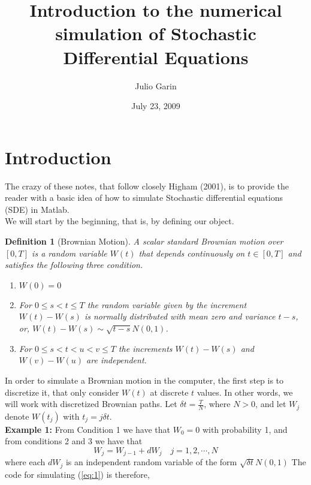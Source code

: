 \documentclass[12pt,a4paper]{article}
\newtheorem{definition}[theorem]{Definition}
\def\d{\delta}
\begin{document}
\title{Introduction to the numerical simulation of Stochastic Differential Equations}
\author{Julio Garin}

\date{July 23, 2009}

\vskip0.1in

\section{Introduction}

The crazy of these notes, that follow closely Higham (2001), is to provide the reader with a basic idea of how to simulate Stochastic differential equations (SDE) in Matlab. \\
We will start by the beginning, that is, by defining our object. 

\begin{definition}[Brownian Motion] A scalar standard Brownian motion over $[0,T]$ is a random variable $W(t)$ that depends continuously on $t \in [0,T]$ and satisfies the following three condition. 
\begin{enumerate}[1.]
	\item $W(0)=0$
	\item For $0\leq s <t\leq T$ the random variable given by the increment $W(t)-W(s)$ is normally distributed with mean zero and variance $t-s$, or, $W(t)-W(s) \sim \sqrt{t-s}N(0,1)$. %
	\item For $0\leq s <t<u<v\leq T$ the increments $W(t)-W(s)$ and $W(v)-W(u)$ are independent.
\end{enumerate}
\end{definition}
In order to simulate a Brownian motion in the computer, the first step is to discretize it, that only consider $W(t)$ at discrete $t$ values. In other words, we will work with discretized Brownian paths. Let $\d t=\frac{T}{N}$, where $N>0$, and let $W_j$ denote $W(t_j)$ with $t_j=j \d t$. \\

\noindent \textbf{Example 1:}
From Condition 1 we have that $W_0=0$ with probability 1, and from conditions 2 and 3 we have that 
\begin{equation} \label{eq:1}
W_j=W_{j-1}+dW_j \quad j=1,2,\cdots ,N
\end{equation}
where each $dW_j$ is an independent random variable of the form $\sqrt{\d t}N(0,1)$
The code for simulating (\ref{eq:1}) is therefore,
\end{document}
